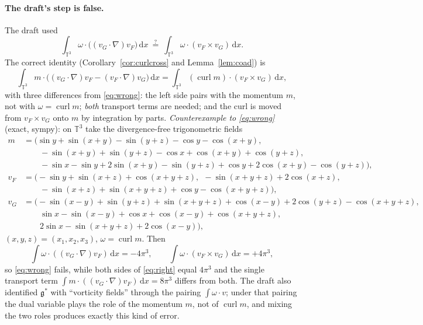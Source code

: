 \documentclass[11pt]{article}
\theoremstyle{definition}
\newcommand{\T}{\mathbb{T}^3}
\newcommand{\g}{\mathfrak{g}}
\newcommand{\dd}{\,\mathrm{d}x}
\newcommand{\curl}{\operatorname{curl}}
\begin{document}
\paragraph{The draft's step is false.} The draft used
\begin{equation}\label{eq:wrong}
\int_{\T}\omega\cdot\big((v_G\cdot\nabla)v_F\big)\dd\ \overset{?}{=}\ \int_{\T}\omega\cdot(v_F\times v_G)\dd .
\end{equation}
The correct identity (Corollary~\ref{cor:curlcross} and Lemma~\ref{lem:coad}) is
\begin{equation}\label{eq:right}
\int_{\T}m\cdot\big((v_G\cdot\nabla)v_F-(v_F\cdot\nabla)v_G\big)\dd=\int_{\T}(\curl m)\cdot(v_F\times v_G)\dd ,
\end{equation}
with three differences from \eqref{eq:wrong}: the left side pairs with the momentum $m$, not with
$\omega=\curl m$; \emph{both} transport terms are needed; and the curl is moved from $v_F\times v_G$
onto $m$ by integration by parts. \emph{Counterexample to \eqref{eq:wrong}} (exact, sympy): on $\T$ take the
divergence-free trigonometric fields
\begin{align*}
m&=\big(\sin y+\sin(x+y)-\sin(y+z)-\cos y-\cos(x+y),\\
&\qquad -\sin(x+y)+\sin(y+z)-\cos x+\cos(x+y)+\cos(y+z),\\
&\qquad -\sin x-\sin y+2\sin(x+y)-\sin(y+z)+\cos y+2\cos(x+y)-\cos(y+z)\big),\\
v_F&=\big(-\sin y+\sin(x+z)+\cos(x+y+z),\ \ -\sin(x+y+z)+2\cos(x+z),\\
&\qquad -\sin(x+z)+\sin(x+y+z)+\cos y-\cos(x+y+z)\big),\\
v_G&=\big(-\sin(x-y)+\sin(y+z)+\sin(x+y+z)+\cos(x-y)+2\cos(y+z)-\cos(x+y+z),\\
&\qquad \sin x-\sin(x-y)+\cos x+\cos(x-y)+\cos(x+y+z),\\
&\qquad 2\sin x-\sin(x+y+z)+2\cos(x-y)\big),
\end{align*}
$(x,y,z)=(x_1,x_2,x_3)$, $\omega=\curl m$. Then
\[
\int\omega\cdot((v_G\cdot\nabla)v_F)\dd=-4\pi^3,\qquad \int\omega\cdot(v_F\times v_G)\dd=+4\pi^3,
\]
so \eqref{eq:wrong} fails, while both sides of \eqref{eq:right} equal $4\pi^3$ and the single transport
term $\int m\cdot((v_G\cdot\nabla)v_F)\dd=8\pi^3$ differs from both. The draft also identified $\g^*$ with
``vorticity fields'' through the pairing $\int\omega\cdot v$; under that pairing the dual variable plays the role
of the momentum $m$, not of $\curl m$, and mixing the two roles produces exactly this kind of error.
\end{document}
